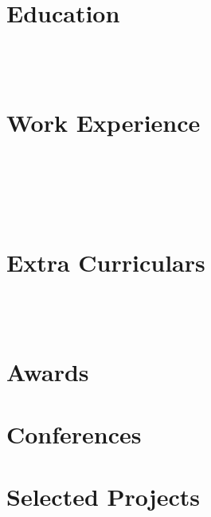 \documentclass[a4paper,11pt]{article}
\begin{document}
\pagestyle{empty}

 \\[2pt]
 \\[-20pt]


\section{Education}
 \\[10pt]
 \\[-16pt]


\section{Work Experience}
 \\[10pt]
 \\[10pt]
 \\[10pt]
 \\[-14pt]

\section{Extra Curriculars}
 \\[10pt]
 \\[-10pt]

\newpage

\section{Awards}


\section{Conferences}


\section{Selected Projects}
 \\[10pt]
 \\[10pt]
 \\[10pt]
 
\end{document}
